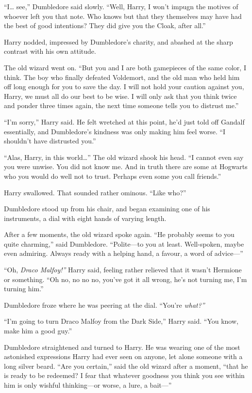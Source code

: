 ``I\ldots{} see,'' Dumbledore said slowly. ``Well, Harry, I won't impugn
the motives of whoever left you that note. Who knows but that they
themselves may have had the best of good intentions? They did give you
the Cloak, after all.''

Harry nodded, impressed by Dumbledore's charity, and abashed at the
sharp contrast with his own attitude.

The old wizard went on. ``But you and I are both gamepieces of the same
color, I think. The boy who finally defeated Voldemort, and the old man
who held him off long enough for you to save the day. I will not hold
your caution against you, Harry, we must all do our best to be wise. I
will only ask that you think twice and ponder three times again, the
next time someone tells you to distrust me.''

``I'm sorry,'' Harry said. He felt wretched at this point, he'd just
told off Gandalf essentially, and Dumbledore's kindness was only making
him feel worse. ``I shouldn't have distrusted you.''

``Alas, Harry, in this world\ldots{}'' The old wizard shook his head.
``I cannot even say you were unwise. You did not know me. And in truth
there are some at Hogwarts who you would do well not to trust. Perhaps
even some you call friends.''

Harry swallowed. That sounded rather ominous. ``Like who?''

Dumbledore stood up from his chair, and began examining one of his
instruments, a dial with eight hands of varying length.

After a few moments, the old wizard spoke again. ``He probably seems to
you quite charming,'' said Dumbledore. ``Polite---to you at least.
Well-spoken, maybe even admiring. Always ready with a helping hand, a
favour, a word of advice---''

``Oh, \emph{Draco Malfoy!''} Harry said, feeling rather relieved that it
wasn't Hermione or something. ``Oh no, no no no, you've got it all
wrong, he's not turning me, I'm turning him.''

Dumbledore froze where he was peering at the dial. ``You're
\emph{what?''}

``I'm going to turn Draco Malfoy from the Dark Side,'' Harry said. ``You
know, make him a good guy.''

Dumbledore straightened and turned to Harry. He was wearing one of the
most astonished expressions Harry had ever seen on anyone, let alone
someone with a long silver beard. ``Are you certain,'' said the old
wizard after a moment, ``that he is ready to be redeemed? I fear that
whatever goodness you think you see within him is only wishful
thinking---or worse, a lure, a bait---''

